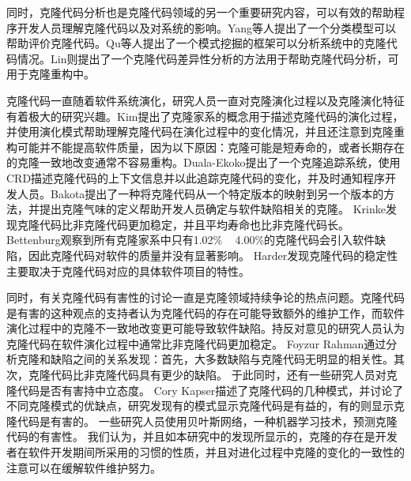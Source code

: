 同时，克隆代码分析也是克隆代码领域的另一个重要研究内容，可以有效的帮助程序开发人员理解克隆代码以及对系统的影响。Yang等人提出了一个分类模型可以帮助评价克隆代码\cite{yang2015classification}。Qu等人提出了一个模式挖掘的框架可以分析系统中的克隆代码情况\cite{qu2014pattern}。Lin则提出了一个克隆代码差异性分析的方法用于帮助克隆代码分析，可用于克隆重构中\cite{lin2014detecting}。

克隆代码一直随着软件系统演化，研究人员一直对克隆演化过程以及克隆演化特征有着极大的研究兴趣。Kim提出了克隆家系的概念用于描述克隆代码的演化过程，并使用演化模式帮助理解克隆代码在演化过程中的变化情况，并且还注意到克隆重构可能并不能提高软件质量，因为以下原因：克隆可能是短寿命的，或者长期存在的克隆一致地改变通常不容易重构\cite{kim2005empirical}。Duala-Ekoko提出了一个克隆追踪系统，使用CRD描述克隆代码的上下文信息并以此追踪克隆代码的变化，并及时通知程序开发人员\cite{duala2010clone}。Bakota提出了一种将克隆代码从一个特定版本的映射到另一个版本的方法，并提出克隆气味的定义帮助开发人员确定与软件缺陷相关的克隆\cite{bakota2011tracking,bakota2007clone}。 Krinke发现克隆代码比非克隆代码更加稳定，并且平均寿命也比非克隆代码长\cite{krinke2008cloned}。 Bettenburg观察到所有克隆家系中只有1.02\% ~ 4.00\%的克隆代码会引入软件缺陷，因此克隆代码对软件的质量并没有显著影响\cite{bettenburg2009empirical}。  Harder发现克隆代码的稳定性主要取决于克隆代码对应的具体软件项目的特性\cite{harder2013cloned}。

同时，有关克隆代码有害性的讨论一直是克隆领域持续争论的热点问题。克隆代码是有害的这种观点的支持者认为克隆代码的存在可能导致额外的维护工作，而软件演化过程中的克隆不一致地改变更可能导致软件缺陷\cite{inoue2012experience}。持反对意见的研究人员认为克隆代码在软件演化过程中通常比非克隆代码更加稳定\cite{krinke2008cloned}。 Foyzur Ra​​hman通过分析克隆和缺陷之间的关系发现：首先，大多数缺陷与克隆代码无明显的相关性。其次，克隆代码比非克隆代码具有更少的缺陷\cite{rahman2012clones}。
 于此同时，还有一些研究人员对克隆代码是否有害持中立态度。  Cory Kapser描述了克隆代码的几种模式，并讨论了不同克隆模式的优缺点，研究发现有的模式显示克隆代码是有益的，有的则显示克隆代码是有害的\cite{kapser2006cloning}。  一些研究人员使用贝叶斯网络，一种机器学习技术，预测克隆代码的有害性\cite{wang2012can}。  我们认为，并且如本研究中的发现所显示的，克隆的存在是开发者在软件开发期间所采用的习惯的性质，并且对进化过程中克隆的变化的一致性的注意可以在缓解软件维护努力。


